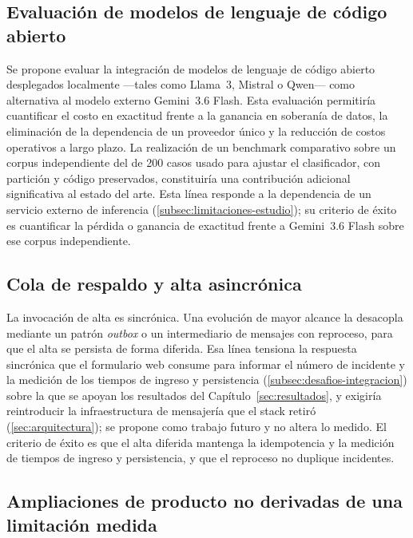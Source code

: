 \subsection{Evaluación de modelos de lenguaje de código abierto}\label{subsec:evaluacion-modelos-abiertos}

Se propone evaluar la integración de modelos de lenguaje de código abierto desplegados localmente ---tales como Llama~3, Mistral o Qwen--- como alternativa al modelo externo Gemini~3.6 Flash. Esta evaluación permitiría cuantificar el costo en exactitud frente a la ganancia en soberanía de datos, la eliminación de la dependencia de un proveedor único y la reducción de costos operativos a largo plazo. La realización de un benchmark comparativo sobre un corpus independiente del de 200 casos usado para ajustar el clasificador, con partición y código preservados, constituiría una contribución adicional significativa al estado del arte. Esta línea responde a la dependencia de un servicio externo de inferencia (\autoref{subsec:limitaciones-estudio}); su criterio de éxito es cuantificar la pérdida o ganancia de exactitud frente a Gemini~3.6 Flash sobre ese corpus independiente.

\subsection{Cola de respaldo y alta asincrónica}\label{subsec:cola-respaldo}

La invocación de alta es sincrónica. Una evolución de mayor alcance la desacopla mediante un patrón \emph{outbox} o un intermediario de mensajes con reproceso, para que el alta se persista de forma diferida. Esa línea tensiona la respuesta sincrónica que el formulario web consume para informar el número de incidente y la medición de los tiempos de ingreso y persistencia (\autoref{subsec:desafios-integracion}) sobre la que se apoyan los resultados del Capítulo~\ref{sec:resultados}, y exigiría reintroducir la infraestructura de mensajería que el stack retiró (\autoref{sec:arquitectura}); se propone como trabajo futuro y no altera lo medido. El criterio de éxito es que el alta diferida mantenga la idempotencia y la medición de tiempos de ingreso y persistencia, y que el reproceso no duplique incidentes.

\subsection{Ampliaciones de producto no derivadas de una limitación medida}\label{subsec:ampliaciones-producto}


